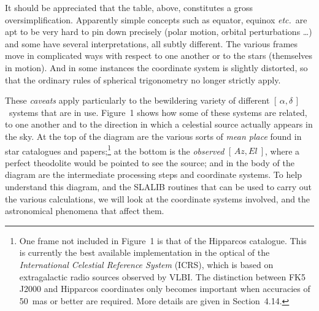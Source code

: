 \documentclass[11pt,twoside]{article}
\newcommand{\radec}     {$[\,\alpha,\delta\,]$}
\newcommand{\azel}      {$[\,Az,El~]$}
\begin{document}
It should be appreciated that the table, above, constitutes
a gross oversimplification.   Apparently
simple concepts such as equator, equinox {\it etc.}\ are apt to be very hard to
pin down precisely (polar motion, orbital perturbations \ldots) and
some have several interpretations, all subtly different.  The various
frames move in complicated ways with respect to one another or to
the stars (themselves in motion).  And in some instances the
coordinate system is slightly distorted, so that the
ordinary rules of spherical trigonometry no longer strictly apply.

These {\it caveats}\/
apply particularly to the bewildering variety of different
\radec\ systems that are in use.  Figure~1 shows how
some of these systems are related, to one another and
to the direction in which a celestial source actually
appears in the sky.  At the top of the diagram are
the various sorts of {\it mean place}\/
found in star catalogues and papers;\footnote{One frame not included in
Figure~1 is that of the Hipparcos catalogue.  This is currently the
best available implementation in the optical of the {\it International
Celestial Reference System}\/ (ICRS), which is based on extragalactic
radio sources observed by VLBI.  The distinction between FK5 J2000
and Hipparcos coordinates only becomes important when accuracies of
50~mas or better are required.  More details are given in
Section~4.14.} at the bottom is the
{\it observed}\/ \azel, where a perfect theodolite would
be pointed to see the source;  and in the body of
the diagram are
the intermediate processing steps and coordinate
systems.  To help
understand this diagram, and the SLALIB routines that can
be used to carry out the various calculations, we will look at the coordinate
systems involved, and the astronomical phenomena that
affect them.
\end{document}

